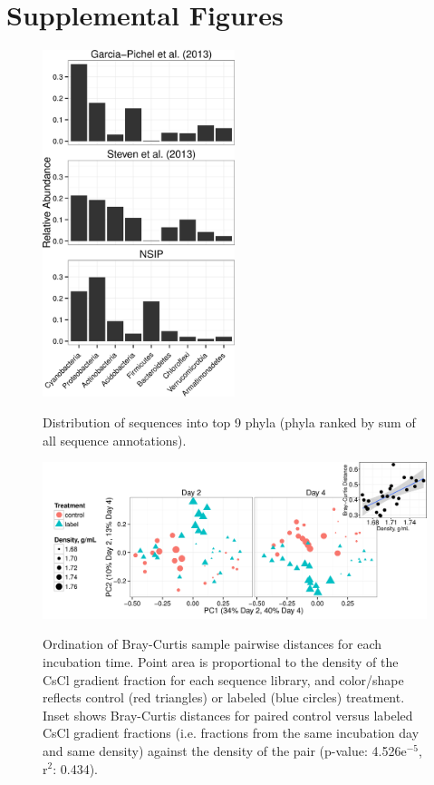 \section{Supplemental Figures}
\newpage

\begin{figure}[h!]
  \centering
  \caption{Distribution of sequences into top 9 phyla (phyla ranked by sum of all sequence annotations).}
    \includegraphics[width=0.5\textwidth]{figures/study_phylum_dist/study_phylum_dist.png}
  \label{fig:study_phy_dist}
\end{figure}

\begin{figure}[H]
  \centering
  \caption{Ordination of Bray-Curtis sample pairwise distances for each incubation time. Point area is proportional to the density of the CsCl gradient fraction for each sequence library, and color/shape reflects control (red triangles) or labeled (blue circles) treatment. Inset shows Bray-Curtis distances for paired control versus labeled CsCl gradient fractions (i.e. fractions from the same incubation day and same density) against the density of the pair (p-value: 4.526e$^{-5}$, r$^{2}$: 0.434).}
  \includegraphics[width=1.0\textwidth]{figures/ordination_all_day_facet/ordination_day_facet_w_inset.png}
  \label{fig:ordination}
\end{figure}

